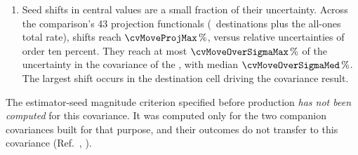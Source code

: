 \begin{enumerate}
\item Seed shifts in central values are a small fraction of their uncertainty. Across the comparison's 43 projection functionals (\zprojCells\ destinations plus the all-ones total rate), shifts reach $\cvMoveProjMax\,\%$, versus relative uncertainties of order ten percent. They reach at most $\cvMoveOverSigmaMax\,\%$ of the uncertainty in the covariance of the \resFiveAxis{}, with median $\cvMoveOverSigmaMed\,\%$. The largest shift occurs in the destination cell driving the covariance result.

\end{enumerate}

\noindent The estimator-seed magnitude criterion specified before production \emph{has not been computed} for this covariance. It was computed only for the two companion covariances built for that purpose, and their outcomes do not transfer to this covariance (Ref.~\cite{NoteRecords2026}, ).
